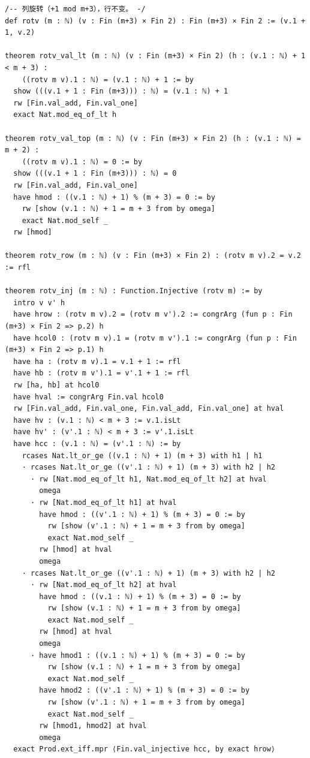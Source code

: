 \documentclass[11pt]{article}
\begin{document}
\begin{lstlisting}
/-- 列旋转（+1 mod m+3），行不变。 -/
def rotv (m : ℕ) (v : Fin (m+3) × Fin 2) : Fin (m+3) × Fin 2 := (v.1 + 1, v.2)

theorem rotv_val_lt (m : ℕ) (v : Fin (m+3) × Fin 2) (h : (v.1 : ℕ) + 1 < m + 3) :
    ((rotv m v).1 : ℕ) = (v.1 : ℕ) + 1 := by
  show (((v.1 + 1 : Fin (m+3))) : ℕ) = (v.1 : ℕ) + 1
  rw [Fin.val_add, Fin.val_one]
  exact Nat.mod_eq_of_lt h

theorem rotv_val_top (m : ℕ) (v : Fin (m+3) × Fin 2) (h : (v.1 : ℕ) = m + 2) :
    ((rotv m v).1 : ℕ) = 0 := by
  show (((v.1 + 1 : Fin (m+3))) : ℕ) = 0
  rw [Fin.val_add, Fin.val_one]
  have hmod : ((v.1 : ℕ) + 1) % (m + 3) = 0 := by
    rw [show (v.1 : ℕ) + 1 = m + 3 from by omega]
    exact Nat.mod_self _
  rw [hmod]

theorem rotv_row (m : ℕ) (v : Fin (m+3) × Fin 2) : (rotv m v).2 = v.2 := rfl

theorem rotv_inj (m : ℕ) : Function.Injective (rotv m) := by
  intro v v' h
  have hrow : (rotv m v).2 = (rotv m v').2 := congrArg (fun p : Fin (m+3) × Fin 2 => p.2) h
  have hcol0 : (rotv m v).1 = (rotv m v').1 := congrArg (fun p : Fin (m+3) × Fin 2 => p.1) h
  have ha : (rotv m v).1 = v.1 + 1 := rfl
  have hb : (rotv m v').1 = v'.1 + 1 := rfl
  rw [ha, hb] at hcol0
  have hval := congrArg Fin.val hcol0
  rw [Fin.val_add, Fin.val_one, Fin.val_add, Fin.val_one] at hval
  have hv : (v.1 : ℕ) < m + 3 := v.1.isLt
  have hv' : (v'.1 : ℕ) < m + 3 := v'.1.isLt
  have hcc : (v.1 : ℕ) = (v'.1 : ℕ) := by
    rcases Nat.lt_or_ge ((v.1 : ℕ) + 1) (m + 3) with h1 | h1
    · rcases Nat.lt_or_ge ((v'.1 : ℕ) + 1) (m + 3) with h2 | h2
      · rw [Nat.mod_eq_of_lt h1, Nat.mod_eq_of_lt h2] at hval
        omega
      · rw [Nat.mod_eq_of_lt h1] at hval
        have hmod : ((v'.1 : ℕ) + 1) % (m + 3) = 0 := by
          rw [show (v'.1 : ℕ) + 1 = m + 3 from by omega]
          exact Nat.mod_self _
        rw [hmod] at hval
        omega
    · rcases Nat.lt_or_ge ((v'.1 : ℕ) + 1) (m + 3) with h2 | h2
      · rw [Nat.mod_eq_of_lt h2] at hval
        have hmod : ((v.1 : ℕ) + 1) % (m + 3) = 0 := by
          rw [show (v.1 : ℕ) + 1 = m + 3 from by omega]
          exact Nat.mod_self _
        rw [hmod] at hval
        omega
      · have hmod1 : ((v.1 : ℕ) + 1) % (m + 3) = 0 := by
          rw [show (v.1 : ℕ) + 1 = m + 3 from by omega]
          exact Nat.mod_self _
        have hmod2 : ((v'.1 : ℕ) + 1) % (m + 3) = 0 := by
          rw [show (v'.1 : ℕ) + 1 = m + 3 from by omega]
          exact Nat.mod_self _
        rw [hmod1, hmod2] at hval
        omega
  exact Prod.ext_iff.mpr ⟨Fin.val_injective hcc, by exact hrow⟩


\end{lstlisting}
\end{document}
